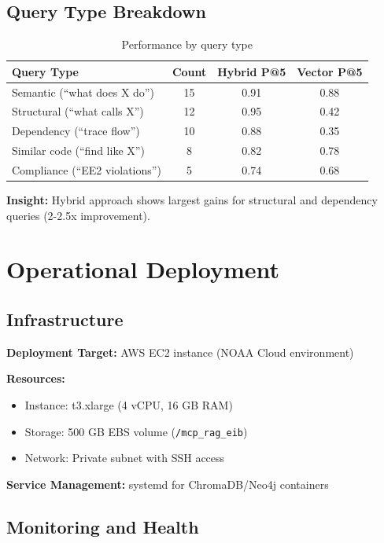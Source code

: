 \documentclass[11pt,letterpaper]{article}
\begin{document}
\subsection{Query Type Breakdown}

\begin{table}[h]
\centering
\caption{Performance by query type}
\begin{tabular}{@{}lccc@{}}
\toprule
\textbf{Query Type} & \textbf{Count} & \textbf{Hybrid P@5} & \textbf{Vector P@5} \\
\midrule
Semantic (``what does X do'') & 15 & 0.91 & 0.88 \\
Structural (``what calls X'') & 12 & 0.95 & 0.42 \\
Dependency (``trace flow'') & 10 & 0.88 & 0.35 \\
Similar code (``find like X'') & 8 & 0.82 & 0.78 \\
Compliance (``EE2 violations'') & 5 & 0.74 & 0.68 \\
\bottomrule
\end{tabular}
\label{tab:query-breakdown}
\end{table}

\textbf{Insight:} Hybrid approach shows largest gains for structural and dependency queries (2-2.5x improvement).

\section{Operational Deployment}
\label{sec:deployment}

\subsection{Infrastructure}

\textbf{Deployment Target:} AWS EC2 instance (NOAA Cloud environment)

\textbf{Resources:}
\begin{itemize}
    \item Instance: t3.xlarge (4 vCPU, 16 GB RAM)
    \item Storage: 500 GB EBS volume (\texttt{/mcp\_rag\_eib})
    \item Network: Private subnet with SSH access
\end{itemize}

\textbf{Service Management:} systemd for ChromaDB/Neo4j containers

\subsection{Monitoring and Health}
\end{document}
